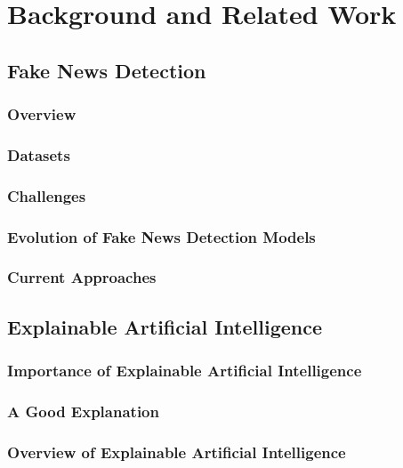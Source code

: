 
\chapter{Background and Related Work}\label{chapter:background}

\section{Fake News Detection}

\subsection{Overview}

\subsection{Datasets}

\subsection{Challenges}

\subsection{Evolution of Fake News Detection Models}

\subsection{Current Approaches}

\section{Explainable Artificial Intelligence}

\subsection{Importance of Explainable Artificial Intelligence}

\subsection{A Good Explanation}

\subsection{Overview of Explainable Artificial Intelligence}


